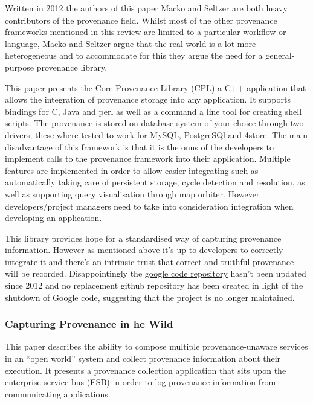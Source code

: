 Written in 2012 the authors of this paper Macko and Seltzer are both heavy contributors of the provenance field. Whilst most of the other provenance frameworks mentioned in this review are limited to a particular workflow or language, Macko and Seltzer argue that the real world is a lot more heterogeneous and to accommodate for this they argue the need for a general-purpose provenance library.

This paper presents the Core Provenance Library (CPL) a C++ application that allows the integration of provenance storage into any application. It supports bindings for C, Java and perl as well as a command a line tool for creating shell scripts. The provenance is stored on database system of your choice through two drivers; these where tested to work for MySQL, PostgreSQl and 4store. The main disadvantage of this framework is that it is the onus of the developers to implement calls to the provenance framework into their application. Multiple features are implemented in order to allow easier integrating such as automatically taking care of persistent storage, cycle detection and resolution, as well as supporting query visualisation through map orbiter\cite{Seltzer2011}. However developers/project managers need to take into consideration integration when developing an application.

This library provides hope for a standardised way of capturing provenance information. However as mentioned above it's up to developers to correctly integrate it and there's an intrinsic trust that correct and truthful provenance will be recorded. Disappointingly the \href{https://code.google.com/p/core-provenance-library/}{google code repository} hasn't been updated since 2012 and no replacement github repository has been created in light of the shutdown of Google code, suggesting that the project is no longer maintained.

\subsubsection{Capturing Provenance in he Wild\cite{Allen2010}}
\label{sub:capturing_provenance_in_he_wildallen2010}

This paper describes the ability to compose multiple provenance-unaware services in an ``open world'' system and collect provenance information about their execution. It presents a provenance collection application that sits upon the enterprise service bus (ESB) in order to log provenance information from communicating applications.

